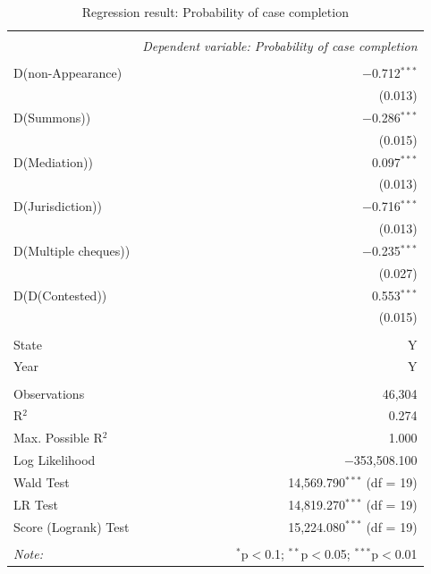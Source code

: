 \begin{table}[!ht]
  \caption{Regression result: Probability of case completion}\label{tab:survialProb}
  \footnotesize
  \begin{tabular}{lr}
    \\[-1.8ex] 
    \hline \\[-1.8ex] 
    & \multicolumn{1}{c}{\textit{Dependent variable: Probability of case completion}} \\ 
    \cline{2-2} 
    \hline \\[-1.8ex] 
			
    D(non-Appearance) & $-$0.712$^{***}$ \\ 
    & (0.013) \\ 
    D(Summons)) & $-$0.286$^{***}$ \\ 
    & (0.015) \\ 
    D(Mediation)) & 0.097$^{***}$ \\ 
    & (0.013) \\ 
    D(Jurisdiction)) & $-$0.716$^{***}$ \\ 
    & (0.013) \\ 
    D(Multiple cheques)) & $-$0.235$^{***}$ \\ 
    & (0.027) \\ 
    D(D(Contested)) & 0.553$^{***}$ \\ 
    & (0.015) \\ 
    \hline \\[-1.8ex]
    State & Y \\
    Year & Y \\ 
    \hline \\[-1.8ex]
    Observations & 46,304 \\ 
    R$^{2}$ & 0.274 \\ 
    Max. Possible R$^{2}$ & 1.000 \\ 
    Log Likelihood & $-$353,508.100 \\ 
    Wald Test & 14,569.790$^{***}$ (df = 19) \\ 
    LR Test & 14,819.270$^{***}$ (df = 19) \\ 
    Score (Logrank) Test & 15,224.080$^{***}$ (df = 19) \\ 
    \hline 
    \hline \\[-1.8ex] 
    \textit{Note:}  & \multicolumn{1}{r}{$^{*}$p$<$0.1; $^{**}$p$<$0.05; $^{***}$p$<$0.01} \\ 
  \end{tabular}
\end{table}

